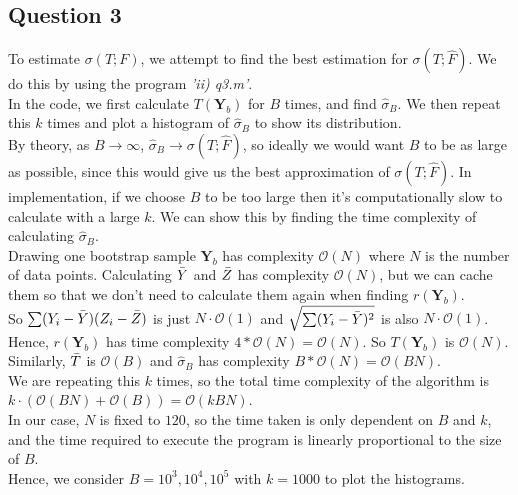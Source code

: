 \documentclass[10pt]{article}
\begin{document}
\subsection*{Question 3}
To estimate $\sigma(T;F)$, we attempt to find the best estimation for $\sigma(T;\hat{F})$. We do this by using the program \emph{'ii) q3.m'}.\\
In the code, we first calculate $T(\mathbf{Y}_b)$ for $B$ times, and find $\hat{\sigma}_B$. We then repeat this $k$ times and plot a histogram of $\hat{\sigma}_B$ to show its distribution.\\
By theory, as $B\to\infty$, $\hat{\sigma}_B\to\sigma(T;\hat{F})$, so ideally we would want $B$ to be as large as possible, since this would give us the best approximation of $\sigma(T;\hat{F})$.
In implementation, if we choose $B$ to be too large then it's computationally slow to calculate with a large $k$. We can show this by finding the time complexity of calculating $\hat{\sigma}_B$.\\
Drawing one bootstrap sample $\mathbf{Y}_b$ has complexity $\mathcal{O}(N)$ where $N$ is the number of data points. Calculating $\Bar{Y}$ and $\Bar{Z}$ has complexity $\mathcal{O}(N)$, but we can cache them so that we don't need to calculate them again when finding $r(\mathbf{Y}_b)$.\\
So $\sum(Y_i-\Bar{Y})(Z_i-\Bar{Z})$ is just $N\cdot\mathcal{O}(1)$ and $\sqrt{\sum(Y_i-\Bar{Y})^2}$ is also $N\cdot\mathcal{O}(1)$.\\
Hence, $r(\mathbf{Y}_b)$ has time complexity $4*\mathcal{O}(N)=\mathcal{O}(N)$. So $T(\mathbf{Y}_b)$ is $\mathcal{O}(N)$.\\
Similarly, $\Bar{T}$ is $\mathcal{O}(B)$ and $\hat{\sigma}_B$ has complexity $B*\mathcal{O}(N)=\mathcal{O}(BN)$.\\
We are repeating this $k$ times, so the total time complexity of the algorithm is $k\cdot (\mathcal{O}(BN)+\mathcal{O}(B))=\mathcal{O}(kBN)$.\\
In our case, $N$ is fixed to $120$, so the time taken is only dependent on $B$ and $k$, and the time required to execute the program is linearly proportional to the size of $B$.\\
Hence, we consider $B=10^3,10^4,10^5$ with $k=1000$ to plot the histograms.
\end{document}
